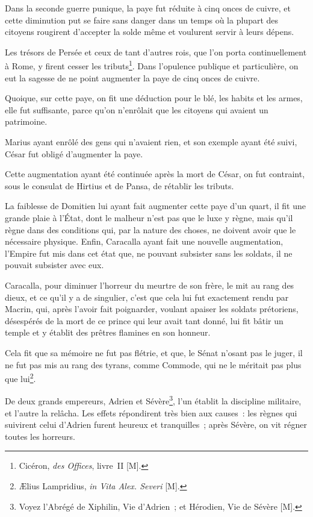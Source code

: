 \documentclass[french,twoside]{book} %
\begin{document}
Dans la seconde guerre punique, la paye fut réduite à cinq onces de cuivre, et cette diminution put se faire sans danger dans un temps où la plupart des citoyens rougirent d’accepter la solde même et voulurent servir à leurs dépens.\par
Les trésors de Persée et ceux de tant d’autres rois, que l’on porta continuellement à Rome, y firent cesser les tributs\footnote{Cicéron, {\itshape des Offices}, livre II [M].}. Dans l’opulence publique et particulière, on eut la sagesse de ne point augmenter la paye de cinq onces de cuivre.\par
Quoique, sur cette paye, on fit une déduction pour le blé, les habits et les armes, elle fut suffisante, parce qu’on n’enrôlait que les citoyens qui avaient un patrimoine.\par
Marius ayant enrôlé des gens qui n’avaient rien, et son exemple ayant été suivi, César fut obligé d’augmenter la paye.\par
Cette augmentation ayant été continuée après la mort de César, on fut contraint, sous le consulat de Hirtius et de Pansa, de rétablir les tributs.\par
La faiblesse de Domitien lui ayant fait augmenter cette paye d’un quart, il fit une grande plaie à l’État, dont le malheur n’est pas que le luxe y règne, mais qu’il règne dans des conditions qui, par la nature des choses, ne doivent avoir que le nécessaire physique. Enfin, Caracalla ayant fait une nouvelle augmentation, l’Empire fut mis dans cet état que, ne pouvant subsister sans les soldats, il ne pouvait subsister avec eux.\par
Caracalla, pour diminuer l’horreur du meurtre de son frère, le mit au rang des dieux, et ce qu’il y a de singulier, c’est que cela lui fut exactement rendu par Macrin, qui, après l’avoir fait poignarder, voulant apaiser les soldats prétoriens, désespérés de la mort de ce prince qui leur avait tant donné, lui fit bâtir un temple et y établit des prêtres flamines en son honneur.\par
Cela fit que sa mémoire ne fut pas flétrie, et que, le Sénat n’osant pas le juger, il ne fut pas mis au rang des tyrans, comme Commode, qui ne le méritait pas plus que lui\footnote{Ælius Lampridius, {\itshape in Vita Alex. Severi} [M].}.\par
De deux grands empereurs, Adrien et Sévère\footnote{Voyez l’Abrégé de Xiphilin, Vie d’Adrien ; et Hérodien, Vie de Sévère [M].}, l’un établit la discipline militaire, et l’autre la relâcha. Les effets répondirent très bien aux causes : les règnes qui suivirent celui d’Adrien furent heureux et tranquilles ; après Sévère, on vit régner toutes les horreurs.\par
\end{document}
